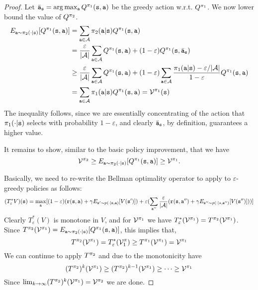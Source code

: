 \begin{proof}
Let $\bar{{\tt a}}_{\tt s}=\arg\max_{\tt a}
Q^{\pi_1}({\tt s},{\tt a})$ be the greedy action w.r.t.
$Q^{\pi_1}$. We now lower bound the value of $Q^{\pi_2}$.
\begin{align*}
E_{{\tt a}\sim\pi_2(\cdot|{\tt s})}[Q^{\pi_1}({\tt s},{\tt a})] &= \sum_{{\tt a} \in \mathcal{A}} \pi_2({\tt a}|{\tt s}) Q^{\pi_1}({\tt s},{\tt a})\\
&= \frac{\varepsilon}{|\mathcal{A}|}\sum_{{\tt a} \in \mathcal{A}}
Q^{\pi_1}({\tt s},{\tt a})+(1-\varepsilon)Q^{\pi_1}({\tt s},\bar{{\tt a}}_{\tt s})\\
&\geq \frac{\varepsilon}{|\mathcal{A}|}\sum_{{\tt a} \in \mathcal{A}}
Q^{\pi_1}({\tt s},{\tt a})+(1-\varepsilon)\sum_{{\tt a} \in
\mathcal{A}}
\frac{\pi_1({\tt a}|{\tt s})-\varepsilon/|\mathcal{A}|}{1-\varepsilon}Q^{\pi_1}({\tt s},{\tt a})\\
&=\sum_{{\tt a} \in \mathcal{A}} \pi_1({\tt a}|{\tt s})Q^{\pi_1}({\tt s},{\tt a})=\mathcal{V}^{\pi_1}({\tt s})\\
\end{align*}
The inequality follows, since we are essentially concentrating of
the action that $\pi_1(\cdot|{\tt s})$ selects with probability
$1-\varepsilon$, and clearly $\bar{{\tt a}}_{\tt s}$, by definition,
guarantees a higher value.

It remains to show, similar to the basic policy improvement, that we
have
$$
\mathcal{V}^{\pi_2}\geq
E_{{\tt a}\sim\pi_2(\cdot|{\tt s})}[Q^{\pi_1}({\tt s},{\tt a})]
\geq \mathcal{V}^{\pi_1}.
$$

Basically, we need to re-write the Bellman optimality operator to
apply to $\varepsilon$-greedy policies as follows:
\[
(T^*_\varepsilon V)({\tt s}) = \max_{\tt a}
[(1-\varepsilon)({\tt r}({\tt s},{\tt a})+\gamma E_{{\tt s}'\sim
p(\cdot |{\tt s},{\tt a})}[V({\tt s}')])+ \varepsilon
(\sum_{{\tt a}''}\frac{\varepsilon}{|\mathcal{A}|}({\tt r}({\tt s},{\tt a}'')
+\gamma E_{{\tt s}''\sim p(\cdot |s,{\tt a}'')}[V({\tt s}'')]))]
\]
Clearly $T^*_\varepsilon(V)$ is monotone in $V$, and for
$\mathcal{V}^{\pi_1}$ we have
$T^*_\varepsilon(\mathcal{V}^{\pi_1})=T^{\pi_2}(\mathcal{V}^{\pi_1})$.
Since $ T^{\pi_2}(\mathcal{V}^{\pi_1}) =
E_{{\tt a}\sim\pi_2(\cdot|{\tt s})}[Q^{\pi_1}({\tt s},{\tt a})]$,
this implies that,
\[
T^{\pi_2}(\mathcal{V}^{\pi_1})=T^*_\varepsilon(\mathcal{V}^\pi_1)
\geq T^{\pi_1}(\mathcal{V}^{\pi_1}) = \mathcal{V}^{\pi_1}
\]
We can continue to apply $T^{\pi_2}$ and due to the monotonicity
have
\[
(T^{\pi_2})^k (\mathcal{V}^{\pi_1}) \geq (T^{\pi_2})^{k-1}
(\mathcal{V}^{\pi_1}) \geq \cdots \geq \mathcal{V}^{\pi_1}
\]
Since $\lim_{k\rightarrow \infty}(T^{\pi_2})^k
(\mathcal{V}^{\pi_1}) = \mathcal{V}^{\pi_2}$ we are done.
\end{proof}

